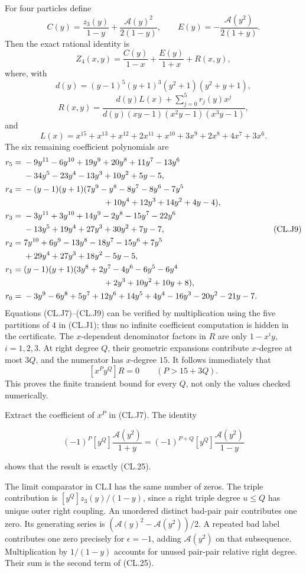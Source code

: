 For four particles define \[
C(y)=\frac{z_3(y)}{1-y}+\frac{\mathcal A(y)^2}{2(1-y)},
\qquad E(y)=-\frac{\mathcal A(y^2)}{2(1+y)}.
\] Then the exact rational identity is \[
Z_4(x,y)=\frac{C(y)}{1-x}+\frac{E(y)}{1+x}+R(x,y),
\tag{CL.J7}
\] where, with \[
d(y)=(y-1)^5(y+1)^3(y^2+1)(y^2+y+1),
\] \[
R(x,y)=
\frac{d(y)L(x)+\sum_{j=0}^5r_j(y)x^j}
{d(y)(xy-1)(x^2y-1)(x^3y-1)},
\tag{CL.J8}
\] and \[
L(x)=x^{15}+x^{13}+x^{12}+2x^{11}+x^{10}
+3x^9+2x^8+4x^7+3x^6.
\] The six remaining coefficient polynomials are \[
\begin{aligned}
r_5={}&-9y^{11}-6y^{10}+19y^9+20y^8+11y^7-13y^6\\
&-34y^5-23y^4-13y^3+10y^2+5y-5,\\
r_4={}&-(y-1)(y+1)
(7y^9-y^8-8y^7-8y^6-7y^5\\
&\hspace{34mm}+10y^4+12y^3+14y^2+4y-4),\\
r_3={}&-3y^{11}+3y^{10}+14y^9-2y^8-15y^7-22y^6\\
&-13y^5+19y^4+27y^3+30y^2+7y-7,\\
r_2={}&7y^{10}+6y^9-13y^8-18y^7-15y^6+7y^5\\
&+29y^4+27y^3+18y^2-5y-5,\\
r_1={}&(y-1)(y+1)
(3y^8+2y^7-4y^6-6y^5-6y^4\\
&\hspace{34mm}+2y^3+10y^2+10y+8),\\
r_0={}&-3y^9-6y^8+5y^7+12y^6+14y^5+4y^4
-16y^3-20y^2-21y-7.
\end{aligned}
\tag{CL.J9}
\] Equations (CL.J7)--(CL.J9) can be verified by multiplication using the five partitions of \(4\) in (CL.J1); thus no infinite coefficient computation is hidden in the certificate. The \(x\)-dependent denominator factors in \(R\) are only \(1-x^iy\), \(i=1,2,3\). At right degree \(Q\), their geometric expansions contribute \(x\)-degree at most \(3Q\), and the numerator has \(x\)-degree \(15\). It follows immediately that \[
[x^Py^Q]R=0\qquad(P>15+3Q).
\tag{CL.J10}
\] This proves the finite transient bound for every \(Q\), not only the values checked numerically.

Extract the coefficient of \(x^P\) in (CL.J7). The identity

\[(-1)^P[y^Q]\frac{\mathcal A(y^2)}{1+y}
=(-1)^{P+Q}[y^Q]\frac{\mathcal A(y^2)}{1-y}\]

shows that the result is exactly (CL.25).

The limit comparator in CL.I has the same number of zeros. The triple contribution is \([y^Q]z_3(y)/(1-y)\), since a right triple degree \(u\leq Q\) has unique outer right coupling. An unordered distinct bad-pair pair contributes one zero. Its generating series is \((\mathcal A(y)^2-\mathcal A(y^2))/2\). A repeated bad label contributes one zero precisely for \(\epsilon=-1\), adding \(\mathcal A(y^2)\) on that subsequence. Multiplication by \(1/(1-y)\) accounts for unused pair-pair relative right degree. Their sum is the second term of (CL.25).

